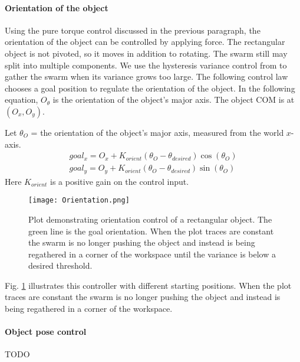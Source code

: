 \paragraph{Orientation of the object}
Using the pure torque control discussed in the previous paragraph, the orientation of the object can be controlled by applying force. 
The rectangular object is not pivoted, so it moves in addition to rotating. 
 The swarm still may split into multiple components.
  We use the hysteresis variance control from \cite{ShahrokhiIROS2015}  to gather the swarm when its variance grows too large. 
  The following control law chooses a goal position to regulate the orientation of the object.  In the following equation, $O_{\theta}$ is the orientation of the object's major axis. The object COM is at $(O_x,O_y)$.

Let $\theta_O$ = the orientation of the object's major axis, measured from the world $x$-axis.
\begin{align}\nonumber
goal_x = O_x +  K_{orient}  ( \theta_O - \theta_{desired} ) \cos(\theta_O) \\
goal_y = O_y +  K_{orient}  ( \theta_O - \theta_{desired} ) \sin(\theta_O)
\end{align}
Here $K_{orient}$ is a positive gain on the control input.  


\begin{figure}
\begin{center}
	\texttt{[image: Orientation.png]}
\end{center}
\vspace{-1em}
\caption{\label{fig:OrientCont}
Plot demonstrating  orientation control of a rectangular object. The green line is the goal orientation.   When the plot traces are constant the swarm is no longer pushing the object and instead is being regathered in a corner of the workspace until the variance is below a desired threshold. 
}
\vspace{-1em}
\end{figure}

Fig. \ref{fig:OrientCont} illustrates this controller with different starting positions. When the plot traces are constant the swarm is no longer pushing the object and instead is being regathered in a corner of the workspace. 

\paragraph{Object pose control}

TODO



